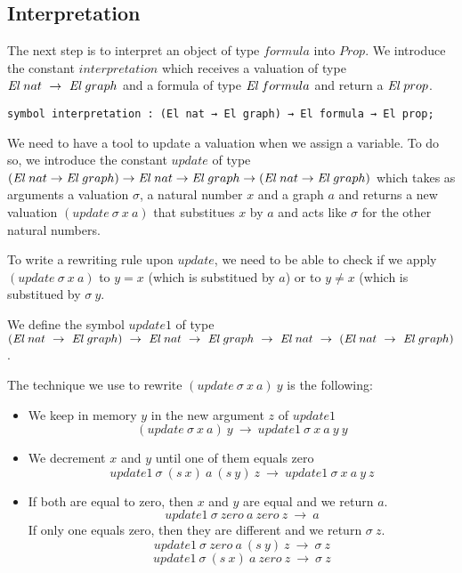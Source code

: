 \documentclass[submission,copyright,creativecommons]{eptcs}
\def\ra{\rightarrow}
\def\lra{\longrightarrow}
\def\El{{\mbox{\it El}}}
\begin{document}
\subsection{Interpretation}

The next step is to interpret an object of type $formula$ into $Prop$. We introduce the constant $interpretation$ which receives a valuation of type $\El \ nat \ \ra \ \El~graph$ and a formula of type $\El \ formula$ and return a $\El~prop$.

\begin{lstlisting}
symbol interpretation : (El nat → El graph) → El formula → El prop;
\end{lstlisting} 

We need to have a tool to update a valuation when we assign a variable. To do so, we introduce the constant $update$ of type $(\El \ nat \ra \El~graph) \ra \El \ nat \ra \El~graph \ra (\El \ nat \ra \El~graph)$ which takes as arguments a valuation $\sigma$, a natural number $x$ and a graph $a$ and returns a new valuation $(update \ \sigma \ x \ a)$ that substitues $x$ by $a$ and acts like $\sigma$ for the other natural numbers.

To write a rewriting rule upon $update$, we need to be able to check if we apply $(update \ \sigma \ x \ a)$ to $y = x$ (which is substitued by $a$) or to $y \neq x$ (which is substitued by $\sigma \ y$.

We define the symbol $update1$ of type $(\El \ nat \ \ra \ \El~graph) \ \ra \ \El \ nat \ \ra \ \El~graph \ \ra \ \El \ nat \ \ra \ (\El \ nat \ \ra \ \El~graph)$.

The technique we use to rewrite $(update \ \sigma \ x \ a) \ y $ is the following: 

\begin{itemize}
\item We keep in memory $y$ in the new argument $z$ of $update1$
$$(update \ \sigma \ x \ a) \ y \ \lra \ update1 \ \sigma \ x \ a \ y \ y$$
\item We decrement $x$ and $y$ until one of them equals zero
$$update1 \ \sigma \ (s \ x) \ a \ (s \ y) \ z \ \lra \ update1 \ \sigma \ x \ a \ y \ z$$
\item If both are equal to zero, then $x$ and $y$ are equal and we return $a$. 
$$ update1 \ \sigma \ zero \ a \ zero \ z \ \lra \ a$$
If only one equals zero, then they are different and we return $\sigma \ z$.
$$update1 \ \sigma \ zero \ a \ (s \ y) \ z \ \lra \ \sigma \ z$$
$$update1 \ \sigma \ (s \ x) \ a \ zero \ z \ \lra \ \sigma \ z$$
\end{itemize}
\end{document}

